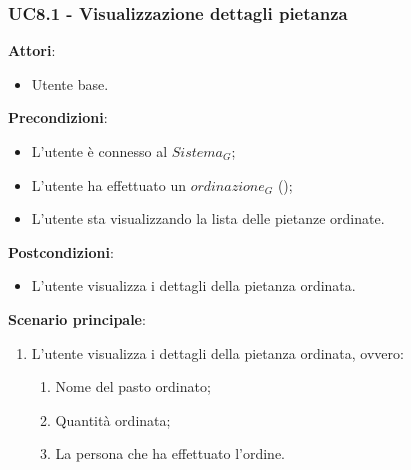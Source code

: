 \subsubsection{UC8.1 - Visualizzazione dettagli pietanza}\label{usecase:8_1}
\textbf{Attori}:
\begin{itemize}
    \item Utente base.
\end{itemize}
\textbf{Precondizioni}:
\begin{itemize}
    \item L'utente è connesso al $\textit{Sistema}_G$;
    \item L'utente ha effettuato un $\textit{ordinazione}_G$ ();
    \item L'utente sta visualizzando la lista delle pietanze ordinate.
\end{itemize}
\textbf{Postcondizioni}:
\begin{itemize}
    \item L'utente visualizza i dettagli della pietanza ordinata.
\end{itemize}
\textbf{Scenario principale}:
\begin{enumerate}
    \item L'utente visualizza i dettagli della pietanza ordinata, ovvero:
    \begin{enumerate}
        \item Nome del pasto ordinato;
        \item Quantità ordinata;
        \item La persona che ha effettuato l'ordine.
    \end{enumerate}
\end{enumerate}
\newpage